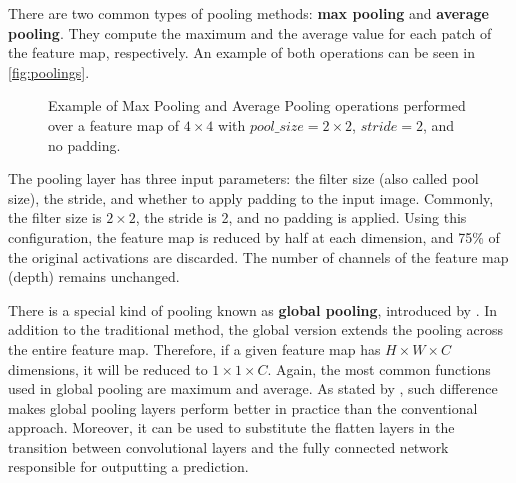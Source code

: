 There are two common types of pooling methods: \textbf{max pooling} and \textbf{average pooling}. They compute the maximum and the average value for each patch of the feature map, respectively. An example of both operations can be seen in \autoref{fig:poolings}.

\begin{figure}[ht]
\centering
{}
\hfill
{}    
\caption{Example of Max Pooling and Average Pooling operations performed over a feature map of $4 \times 4$ with $pool\_size=2 \times 2$, $stride=2$, and no padding.}
\label{fig:poolings}
\end{figure}

The pooling layer has three input parameters: the filter size (also called pool size), the stride, and whether to apply padding to the input image. Commonly, the filter size is $2 \times 2$, the stride is 2, and no padding is applied. Using this configuration, the feature map is reduced by half at each dimension, and 75\% of the original activations are discarded. The number of channels of the feature map (depth) remains unchanged.

There is a special kind of pooling known as \textbf{global pooling}, introduced by \cite{lin2013network}. In addition to the traditional method, the global version extends the pooling across the entire feature map. Therefore, if a given feature map has $H \times W \times C$ dimensions, it will be reduced to $1 \times 1 \times C$. Again, the most common functions used in global pooling are maximum and average. As stated by \cite{zhou2016learning}, such difference makes global pooling layers perform better in practice than the conventional approach. Moreover, it can be used to substitute the flatten layers in the transition between convolutional layers and the fully connected network responsible for outputting a prediction.

